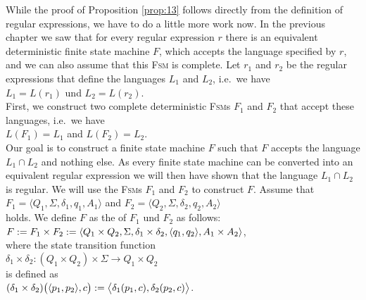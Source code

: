 \proofEng
While the proof of Proposition \ref{prop:13} follows directly from the definition of regular expressions,
we have to do a little more work now. In the previous chapter we saw that for every regular expression
$r$ there is an equivalent deterministic finite state machine $F$, which accepts the language specified by $r$,
and we can also assume that this \textsc{Fsm} is complete. Let $r_1$ and $r_2$ be the regular expressions that
define the languages $L_1$ and $L_2$, i.e.~we have
\\[0.2cm]
\hspace*{1.3cm}
$L_1 = L(r_1)$ \quad und \quad $L_2 = L(r_2)$.
\\[0.2cm]
First, we construct two complete deterministic \textsc{Fsm}s
$F_1$ and $F_2$ that accept these languages, i.e.~we have
\\[0.2cm]
\hspace*{1.3cm}
$L(F_1) = L_1$ \quad and \quad $L(F_2) = L_2$.
\\[0.2cm]
Our goal is to construct a finite state machine $F$ such that $F$ accepts the language
$L_1 \cap L_2$ and nothing else.  As every finite state machine can be converted into an equivalent regular
expression we will then have shown that the language
$L_1 \cap L_2$ is regular.  We will use the \textsc{Fsm}s $F_1$ and $F_2$ to construct $F$.
Assume that
\\[0.2cm]
\hspace*{1.3cm}
$F_1 = \langle Q_1, \Sigma, \delta_1, q_1, A_1 \rangle$ \quad and \quad
$F_2 = \langle Q_2, \Sigma, \delta_2, q_2, A_2 \rangle$
\\[0.2cm]
holds.  We define $F$ as the  of $F_1$ und $F_2$ as follows:
\\[0.2cm]
\hspace*{1.3cm}
$F := F_1 \times F_2 := \langle Q_1 \times Q_2, \Sigma, \delta_1 \times \delta_2, \pair(q_1,q_2), A_1 \times A_2 \rangle$,
\\[0.2cm]
where the state transition function 
\\[0.2cm]
\hspace*{1.3cm}
 $\delta_1 \times \delta_2 : (Q_1 \times Q_2) \times \Sigma \rightarrow Q_1 \times Q_2$ 
\\[0.2cm]
is defined as
\\[0.2cm]
\hspace*{1.3cm}
$(\delta_1 \times \delta_2)\bigl( \pair(p_1, p_2), c \bigr) := \bigl\langle\delta_1(p_1,c), \delta_2(p_2,c)\bigr\rangle$.
\\[0.2cm]
